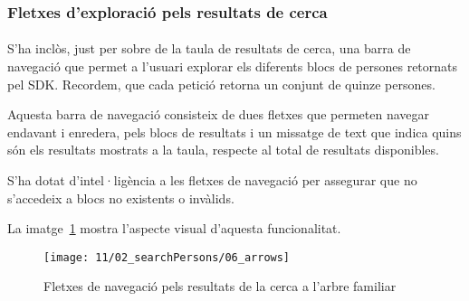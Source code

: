 \subsubsection{Fletxes d'exploració pels resultats de cerca}

\paragraph{}
S'ha inclòs, just per sobre de la taula de resultats de cerca, una barra de navegació que permet a l'usuari explorar els diferents blocs de persones retornats pel SDK. Recordem, que cada petició retorna un conjunt de quinze persones.

Aquesta barra de navegació consisteix de dues fletxes que permeten navegar endavant i enredera, pels blocs de resultats i un missatge de text que indica quins són els resultats mostrats a la taula, respecte al total de resultats disponibles.

S'ha dotat d’intel·ligència a les fletxes de navegació per assegurar que no s'accedeix a blocs no existents o invàlids.

La imatge~\ref{fig:arrowsPersonSearch} mostra l’aspecte visual d’aquesta funcionalitat.

\begin{figure}[h]
    \texttt{[image: 11/02\_searchPersons/06\_arrows]}
    \centering
    \caption{Fletxes de navegació pels resultats de la cerca a l'arbre familiar}\label{fig:arrowsPersonSearch}
\end{figure}
